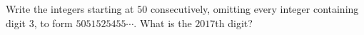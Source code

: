 Write the integers starting at $50$ consecutively, omitting every integer containing digit $3$, to form $5051525455\cdots$. What is the $2017$th digit?

